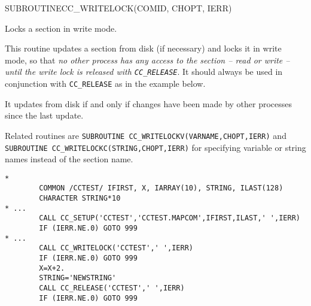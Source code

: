 \begin{routine} %
\subroutine
   {SUBROUTINE}{CC\_WRITELOCK}{(COMID, CHOPT, IERR)}
\begin{overview}
Locks a section in write mode.
\end{overview}
\begin{argdeflist}
\end{argdeflist}
\begin{describe}
This routine updates a section from disk (if necessary) and locks it
in write mode, so that {\em no other process has any access to the
section -- read or write --
until the write lock is released with \verb|CC_RELEASE|}.
It should always be used in conjunction with \verb|CC_RELEASE|
as in the example below.

It updates from disk if and only if changes have been made by other
processes since the last update.

Related routines are \verb|SUBROUTINE CC_WRITELOCKV(VARNAME,CHOPT,IERR)|
and \verb|SUBROUTINE CC_WRITELOCKC(STRING,CHOPT,IERR)| for specifying
variable or string names instead of the section name.

\end{describe}
\begin{options}
\end{options}
\begin{returncodes}
\end{returncodes}
\begin{examplecode}\begin{verbatim}
*
        COMMON /CCTEST/ IFIRST, X, IARRAY(10), STRING, ILAST(128)
        CHARACTER STRING*10
* ...
        CALL CC_SETUP('CCTEST','CCTEST.MAPCOM',IFIRST,ILAST,' ',IERR)
        IF (IERR.NE.0) GOTO 999
* ...
        CALL CC_WRITELOCK('CCTEST',' ',IERR)
        IF (IERR.NE.0) GOTO 999
        X=X+2.
        STRING='NEWSTRING'
        CALL CC_RELEASE('CCTEST',' ',IERR)
        IF (IERR.NE.0) GOTO 999
\end{verbatim}\end{examplecode}
\end{routine}
